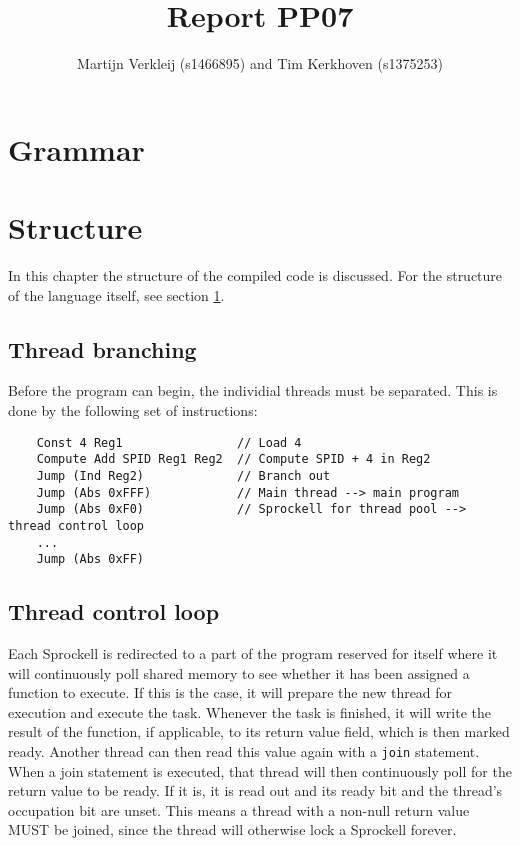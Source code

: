 \documentclass[10pt,a4paper]{report}
\author{Martijn Verkleij (s1466895) and Tim Kerkhoven (s1375253)}
\title{Report PP07}
\begin{document}
\maketitle
\tableofcontents

\chapter{Grammar} \label{chp:grammar}

\chapter{Structure} \label{chp:structure}
In this chapter the structure of the compiled code is discussed. For the structure of the language itself, see section \ref{chp:grammar}. 
\section{Thread branching}
Before the program can begin, the individial threads must be separated. This is done by the following set of instructions:
\begin{verbatim}
	Const 4 Reg1				// Load 4
	Compute Add SPID Reg1 Reg2	// Compute SPID + 4 in Reg2
	Jump (Ind Reg2)				// Branch out
	Jump (Abs 0xFFF)			// Main thread --> main program
	Jump (Abs 0xF0)				// Sprockell for thread pool --> thread control loop
	...
	Jump (Abs 0xFF)
\end{verbatim}

\section{Thread control loop}
Each Sprockell is redirected to a part of the program reserved for itself where it will continuously poll shared memory to see whether it has been assigned a function to execute. If this is the case, it will prepare the new thread for execution and execute the task. Whenever the task is finished, it will write the result of the function, if applicable, to its return value field, which is then marked ready. Another thread can then read this value again with a \texttt{join} statement. When a join statement is executed, that thread will then continuously poll for the return value to be ready. If it is, it is read out and its ready bit and the thread's occupation bit are unset. This means a thread with a non-null return value MUST be joined, since the thread will otherwise lock a Sprockell forever. 
\end{document}
